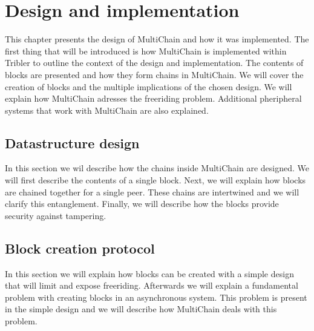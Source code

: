 \chapter{Design and implementation}
\label{chapt:design}
This chapter presents the design of MultiChain and how it was implemented.
The first thing that will be introduced is how MultiChain is implemented within Tribler
to outline the context of the design and implementation.
The contents of blocks are presented and how they form chains in MultiChain.
We will cover the creation of blocks and the multiple implications of the chosen design.
We will explain how MultiChain adresses the freeriding problem.
Additional pheripheral systems that work with MultiChain are also explained.



\section{Datastructure design}
In this section we wil describe how the chains inside MultiChain are designed.
We will first describe the contents of a single block.
Next, we will explain how blocks are chained together for a single peer.
These chains are intertwined and we will clarify this entanglement.
Finally, we will describe how the blocks provide security against tampering.






\section{Block creation protocol}
\label{design:block_creation}
In this section we will explain how blocks can be created with a simple design
that will limit and expose freeriding.
Afterwards we will explain a fundamental problem with creating blocks in an asynchronous system.
This problem is present in the simple design
and we will describe how MultiChain deals with this problem.














